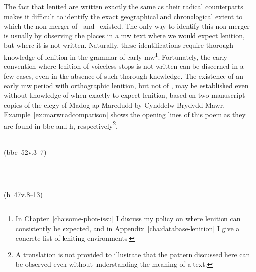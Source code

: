 The fact that lenited  are written exactly the same as their radical counterparts makes it difficult to identify the exact geographical and chronological extent to which the non-merger of \xD\ and \lT\ existed. The only way to identify this non-merger is usually by observing the places in a \gls{mw} text where we would expect lenition, but where it is not written. Naturally, these identifications require thorough knowledge of lenition in  the grammar of early \gls{mw}\footnote{In Chapter~\ref{cha:some-phon-issu} I discuss my policy on where lenition can consistently be expected, and in Appendix~\ref{cha:database-lenition} I give a concrete list of leniting environments.}. Fortunately, the early convention where lenition of voiceless stops is not written can be discerned in a few cases, even in the absence of such thorough knowledge. The existence of an early \gls{mw} period with orthographic lenition, but  not of \lT, may be established even without knowledge of when exactly to expect lenition, based on two manuscript copies of the elegy of Madog ap Maredudd  by Cynddelw Brydydd Mawr. Example~\ref{ex:marwnadcomparison} shows the opening lines of this poem as they are found in \gls{bbc}  and \gls{h}, respectively\footnote{A translation is not provided to illustrate that the pattern discussed here can be observed even without understanding the meaning of a text.}.
\begin{mwl}
\item%
  \begin{minipage}[t]{0.45\textwidth}
    \\
    (\acrshort{bbc}~52v.3--7)
  \end{minipage}~
  \begin{minipage}[t]{0.45\textwidth}
    \\
    (\acrshort{h}~47v.8--13)
  \end{minipage}
  \label{ex:marwnadcomparison}
\end{mwl}
